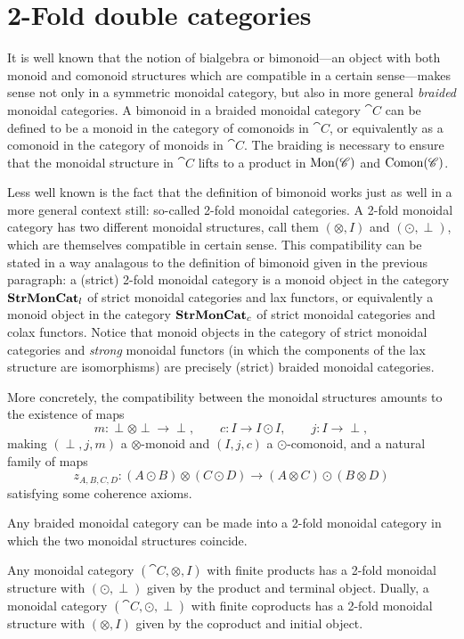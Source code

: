 
\chapter{2-Fold double categories}


It is well known that the notion of bialgebra or bimonoid---an object with both monoid and comonoid structures which are compatible in a certain sense---makes sense not only in a symmetric monoidal category, but also in more general \emph{braided} monoidal categories. A bimonoid in a braided monoidal category $\cat{C}$ can be defined to be a monoid in the category of comonoids in $\cat{C}$, or equivalently as a comonoid in the category of monoids in $\cat{C}$. The braiding is necessary to ensure that the monoidal structure in $\cat{C}$ lifts to a product in $\mathrm{Mon}(\mathscr{C})$ and $\mathrm{Comon}(\mathscr{C})$.

Less well known is the fact that the definition of bimonoid works just as well in a more general context still: so-called 2-fold monoidal categories. A 2-fold monoidal category has two different monoidal structures, call them $(\otimes,I)$ and $(\odot,\perp)$, which are themselves compatible in certain sense. This compatibility can be stated in a way analagous to the definition of bimonoid given in the previous paragraph: a (strict) 2-fold monoidal category is a monoid object in the category $\mathbf{StrMonCat}_l$ of strict monoidal categories and lax functors, or equivalently a monoid object in the category $\mathbf{StrMonCat}_c$ of strict monoidal categories and colax functors. Notice that monoid objects in the category of strict monoidal categories and \emph{strong} monoidal functors (in which the components of the lax structure are isomorphisms) are precisely (strict) braided monoidal categories.

More concretely, the compatibility between the monoidal structures amounts to the existence of maps
\[
	m\colon \perp\otimes\perp\to\perp, \qquad c\colon I\to I\odot I, \qquad j\colon I\to \perp,
\]
making $(\perp,j,m)$ a $\otimes$-monoid and $(I,j,c)$ a $\odot$-comonoid, and a natural family of maps
\[
	z_{A,B,C,D}\colon (A\odot B)\otimes(C\odot D) \to (A\otimes C)\odot(B\otimes D)
\]
satisfying some coherence axioms.

\begin{example}\leavevmode
\begin{compactitem}
	\item Any braided monoidal category can be made into a 2-fold monoidal category in which the two monoidal structures coincide.
	\item Any monoidal category $(\cat{C},\otimes,I)$ with finite products has a 2-fold monoidal structure with $(\odot,\perp)$ given by the product and terminal object. Dually, a monoidal category $(\cat{C},\odot,\perp)$ with finite coproducts has a 2-fold monoidal structure with $(\otimes,I)$ given by the coproduct and initial object.
\end{compactitem}
\end{example}

